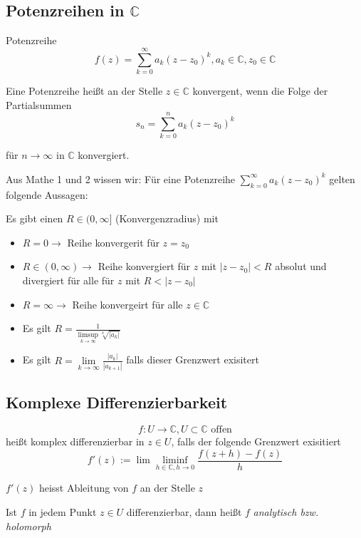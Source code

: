 \documentclass[10pt,a4paper]{article}
\begin{document}
\subsection{Potenzreihen in $\mathbb{C}$}


Potenzreihe $$f(z)=\sum_{k=0}^{\infty} a_k (z-z_0)^{k} , a_k \in \mathbb{C}, z_0 \in \mathbb{C}$$


\begin{satz}

Eine Potenzreihe heißt an der Stelle $z \in \mathbb{C}$ konvergent, wenn die Folge der Partialsummen $$s_n=\sum_{k=0}^{n}a_k (z-z_0)^{k}$$

für $n\rightarrow \infty$ in $\mathbb{C}$ konvergiert.

\end{satz}

Aus Mathe 1 und 2 wissen wir: Für eine Potenzreihe $\sum_{k=0}^{\infty}a_k(z-z_0)^{k}$ gelten folgende Aussagen:

Es gibt einen $R \in (0, \infty]$ (Konvergenzradius) mit

\begin{itemize}
\item $R=0 \rightarrow$ Reihe konvergerit für $z=z_0$
\item $R \in (0,\infty) \rightarrow$ Reihe konvergiert für $z$ mit $|z-z_0|<R$ absolut und divergiert für alle für $z$ mit $R<|z-z_0|$
\item $R = \infty \rightarrow$ Reihe konvergeirt für alle $z \in \mathbb{C}$
\item Es gilt $R=\frac{1}{\limsup\limits_{k \rightarrow \infty} \sqrt[k]{|a_k|} }$
\item Es gilt $R=\lim\limits_{k \rightarrow \infty} \frac{|a_k|}{|a_{k+1}|}$ falls dieser Grenzwert exisitert
\end{itemize}

\subsection{Komplexe Differenzierbarkeit}

\begin{defi}

$$f: U \rightarrow \mathbb{C} , U \subset \mathbb{C} \text{ offen}$$ heißt komplex differenzierbar in $z \in U$, falls der folgende Grenzwert exisitiert $$f'(z) := \lim\liminf_{h \in  \mathbb{C}, h \rightarrow 0} \frac{f(z+h)-f(z)}{h}$$

$f'(z)$ heisst Ableitung von $f$ an der Stelle $z$

Ist $f$ in jedem Punkt $z \in U$ differenzierbar, dann heißt $f$ \emph{analytisch bzw. holomorph}
\end{defi}
\end{document}
